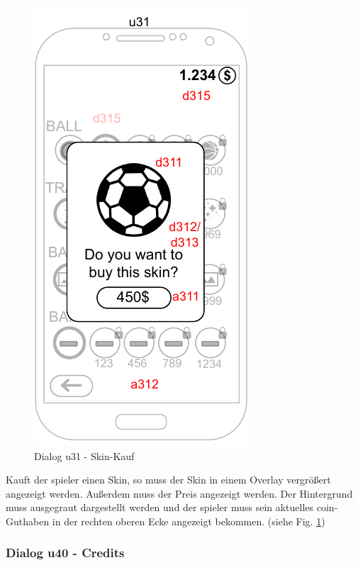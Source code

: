 \begin{figure}[h!]
    \begin{center}
    \includegraphics[scale=1.4]{diagramme/pdf/Mockup-u31.pdf}
    \end{center}
    \caption{Dialog u31 - Skin-Kauf}\label{fig:dia:u31}
\end{figure}

Kauft der \gls{spieler} einen Skin, so muss der Skin in einem Overlay vergrößert angezeigt werden. Außerdem muss der Preis angezeigt werden.
Der Hintergrund muss ausgegraut dargestellt werden und der \gls{spieler} muss sein aktuelles \gls{coin}-Guthaben in der rechten oberen Ecke angezeigt bekommen.
(siehe Fig. \ref{fig:dia:u31})
\clearpage

\subsubsection{Dialog u40 - Credits}\label{dialog:credits}

